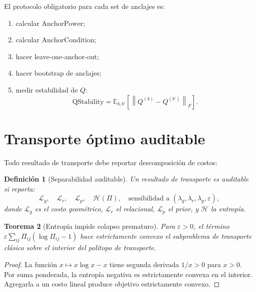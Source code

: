 \documentclass[11pt,a4paper]{article}
\newtheorem{theorem}{Teorema}[section]
\newtheorem{definition}[theorem]{Definición}
\newcommand{\E}{\mathbb{E}}
\newcommand{\1}{\mathbf{1}}
\newcommand{\norm}[1]{\left\lVert #1 \right\rVert}
\numberwithin{equation}{section}
\begin{document}
El protocolo obligatorio para cada set de anclajes es:
\begin{enumerate}[label=(\roman*)]
    \item calcular $\mathrm{AnchorPower}$;
    \item calcular $\mathrm{AnchorCondition}$;
    \item hacer leave-one-anchor-out;
    \item hacer bootstrap de anclajes;
    \item medir estabilidad de $Q$:
\begin{equation}
    \mathrm{QStability}=\E_{b,b'}\left[\norm{Q^{(b)}-Q^{(b')}}_F\right].
\end{equation}
\end{enumerate}

\section{Transporte óptimo auditable}
\label{sec:auditable_transport}

Todo resultado de transporte debe reportar descomposición de costos:

\begin{definition}[Separabilidad auditable]
Un resultado de transporte es auditable si reporta:
\begin{equation}
    \mathcal{L}_g,\quad\mathcal{L}_r,\quad\mathcal{L}_p,\quad\mathcal{H}(\Pi),\quad\text{sensibilidad a }(\lambda_g,\lambda_r,\lambda_p,\varepsilon),
\end{equation}
donde $\mathcal{L}_g$ es el costo geométrico, $\mathcal{L}_r$ el relacional, $\mathcal{L}_p$ el prior, y $\mathcal{H}$ la entropía.
\end{definition}

\begin{theorem}[Entropía impide colapso prematuro]
Para $\varepsilon>0$, el término $\varepsilon\sum_{ij}\Pi_{ij}(\log\Pi_{ij}-1)$ hace estrictamente convexo el subproblema de transporte clásico sobre el interior del politopo de transporte.
\end{theorem}

\begin{proof}
La función $x\mapsto x\log x-x$ tiene segunda derivada $1/x>0$ para $x>0$. Por suma ponderada, la entropía negativa es estrictamente convexa en el interior. Agregarla a un costo lineal produce objetivo estrictamente convexo.
\end{proof}
\end{document}
